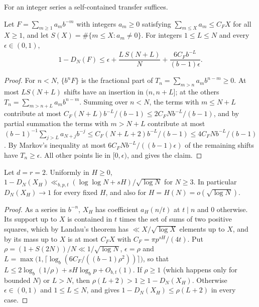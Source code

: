 \documentclass[11pt]{article}
\newcommand{\fr}[1]{\{#1\}}
\begin{document}
For an integer series a self-contained transfer suffices.

\begin{lemma}\label{lem:sparseint}
Let $F=\sum_{m\ge1}a_mb^{-m}$ with integers $a_m\ge0$ satisfying $\sum_{m\le X}a_m\le C_FX$ for all $X\ge1$, and
let $S(X)=\#\{m\le X:a_m\ne0\}$. For integers $1\le L\le N$ and every $\epsilon\in(0,1)$,
\[
1-D_N(F)\le\epsilon+\frac{L\,S(N+L)}N+\frac{6C_Fb^{-L}}{(b-1)\epsilon}.
\]
\end{lemma}

\begin{proof}
For $n<N$, $\fr{b^nF}$ is the fractional part of $T_n=\sum_{m>n}a_mb^{n-m}\ge0$. At most $LS(N+L)$ shifts have an
insertion in $(n,n+L]$; at the others $T_n=\sum_{m>n+L}a_mb^{n-m}$. Summing over $n<N$, the terms with
$m\le N+L$ contribute at most $C_F(N+L)b^{-L}/(b-1)\le2C_FNb^{-L}/(b-1)$, and by partial summation the terms
with $m>N+L$ contribute at most $(b-1)^{-1}\sum_{j>L}a_{N+j}b^{-j}\le C_F(N+L+2)b^{-L}/(b-1)\le4C_FNb^{-L}/(b-1)$. By
Markov's inequality at most $6C_FNb^{-L}/((b-1)\epsilon)$ of the remaining shifts have $T_n\ge\epsilon$. All other
points lie in $[0,\epsilon)$, and  gives the claim.
\end{proof}

\begin{theorem}\label{thm:absorb}
Let $d=r=2$. Uniformly in $H\ge0$, $1-D_N(X_H)\ll_{b,p,t}(\log\log N+sH)/\sqrt{\log N}$ for $N\ge3$. In particular
$D_N(X_H)\to1$ for every fixed $H$, and also for $H=H(N)=o(\sqrt{\log N})$.
\end{theorem}

\begin{proof}
As a series in $b^{-n}$, $X_H$ has coefficient $a_H(n/t)$ at $t\mid n$ and $0$ otherwise. Its support up to $X$
is contained in $t$ times the set of sums of two positive squares, which by Landau's theorem has
$\ll X/\sqrt{\log X}$ elements up to $X$, and by  its mass up to $X$ is at most
$C_FX$ with $C_F=\pi p^{sH}/(4t)$. Put $\rho=(1+S(2N))/N\ll1/\sqrt{\log N}$, $\epsilon=\rho$ and
$L=\max\bigl(1,\lceil\log_b(6C_F/((b-1)\rho^2))\rceil\bigr)$, so that $L\le2\log_b(1/\rho)+sH\log_bp+O_{b,t}(1)$. If
$\rho\ge1$ (which happens only for bounded $N$) or $L>N$, then $\rho(L+2)>1\ge1-D_N(X_H)$. Otherwise
$\epsilon\in(0,1)$ and $1\le L\le N$, and  gives $1-D_N(X_H)\le\rho(L+2)$ in every case.
\end{proof}
\end{document}
